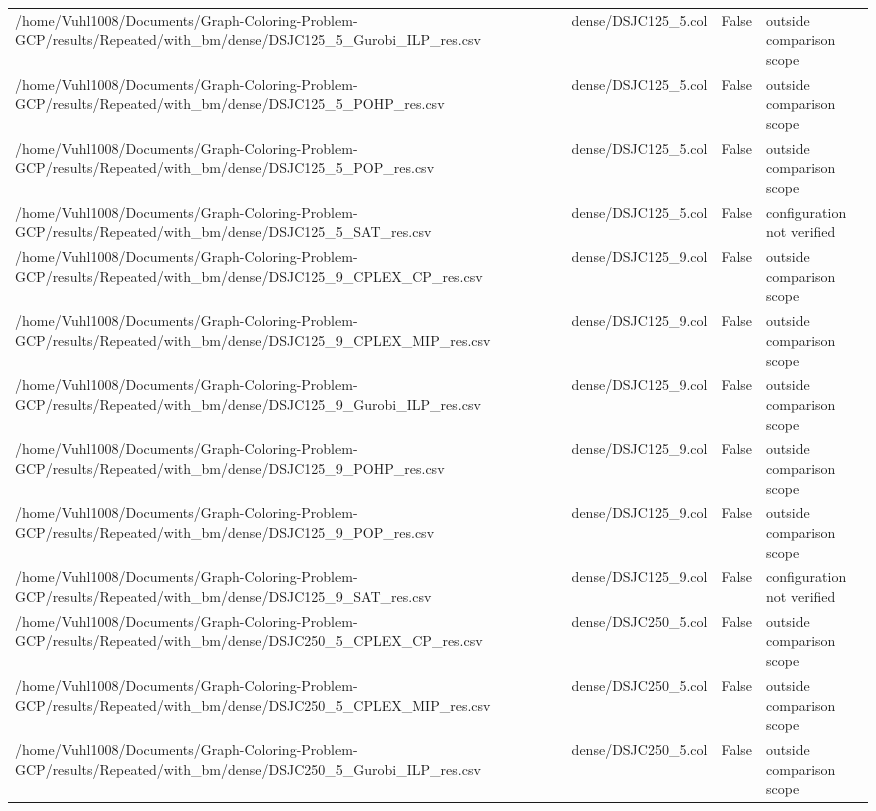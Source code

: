 \begin{table}[htbp]
\begin{tabular}{llll}
/home/Vuhl1008/Documents/Graph-Coloring-Problem-GCP/results/Repeated/with\_bm/dense/DSJC125\_5\_Gurobi\_ILP\_res.csv & dense/DSJC125\_5.col & False & outside comparison scope \\
/home/Vuhl1008/Documents/Graph-Coloring-Problem-GCP/results/Repeated/with\_bm/dense/DSJC125\_5\_POHP\_res.csv & dense/DSJC125\_5.col & False & outside comparison scope \\
/home/Vuhl1008/Documents/Graph-Coloring-Problem-GCP/results/Repeated/with\_bm/dense/DSJC125\_5\_POP\_res.csv & dense/DSJC125\_5.col & False & outside comparison scope \\
/home/Vuhl1008/Documents/Graph-Coloring-Problem-GCP/results/Repeated/with\_bm/dense/DSJC125\_5\_SAT\_res.csv & dense/DSJC125\_5.col & False & configuration not verified \\
/home/Vuhl1008/Documents/Graph-Coloring-Problem-GCP/results/Repeated/with\_bm/dense/DSJC125\_9\_CPLEX\_CP\_res.csv & dense/DSJC125\_9.col & False & outside comparison scope \\
/home/Vuhl1008/Documents/Graph-Coloring-Problem-GCP/results/Repeated/with\_bm/dense/DSJC125\_9\_CPLEX\_MIP\_res.csv & dense/DSJC125\_9.col & False & outside comparison scope \\
/home/Vuhl1008/Documents/Graph-Coloring-Problem-GCP/results/Repeated/with\_bm/dense/DSJC125\_9\_Gurobi\_ILP\_res.csv & dense/DSJC125\_9.col & False & outside comparison scope \\
/home/Vuhl1008/Documents/Graph-Coloring-Problem-GCP/results/Repeated/with\_bm/dense/DSJC125\_9\_POHP\_res.csv & dense/DSJC125\_9.col & False & outside comparison scope \\
/home/Vuhl1008/Documents/Graph-Coloring-Problem-GCP/results/Repeated/with\_bm/dense/DSJC125\_9\_POP\_res.csv & dense/DSJC125\_9.col & False & outside comparison scope \\
/home/Vuhl1008/Documents/Graph-Coloring-Problem-GCP/results/Repeated/with\_bm/dense/DSJC125\_9\_SAT\_res.csv & dense/DSJC125\_9.col & False & configuration not verified \\
/home/Vuhl1008/Documents/Graph-Coloring-Problem-GCP/results/Repeated/with\_bm/dense/DSJC250\_5\_CPLEX\_CP\_res.csv & dense/DSJC250\_5.col & False & outside comparison scope \\
/home/Vuhl1008/Documents/Graph-Coloring-Problem-GCP/results/Repeated/with\_bm/dense/DSJC250\_5\_CPLEX\_MIP\_res.csv & dense/DSJC250\_5.col & False & outside comparison scope \\
/home/Vuhl1008/Documents/Graph-Coloring-Problem-GCP/results/Repeated/with\_bm/dense/DSJC250\_5\_Gurobi\_ILP\_res.csv & dense/DSJC250\_5.col & False & outside comparison scope \\

\end{tabular}
\end{table}
